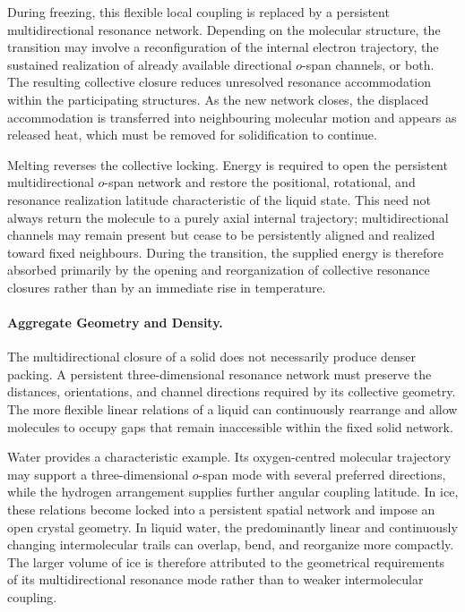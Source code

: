 \documentclass[11pt,a4paper]{article}
\begin{document}
During freezing, this flexible local coupling is replaced by a persistent multidirectional resonance network. Depending on the molecular structure, the transition may involve a reconfiguration of the internal electron trajectory, the sustained realization of already available directional \(o\)-span channels, or both. The resulting collective closure reduces unresolved resonance accommodation within the participating structures. As the new network closes, the displaced accommodation is transferred into neighbouring molecular motion and appears as released heat, which must be removed for solidification to continue.

Melting reverses the collective locking. Energy is required to open the persistent multidirectional \(o\)-span network and restore the positional, rotational, and resonance realization latitude characteristic of the liquid state. This need not always return the molecule to a purely axial internal trajectory; multidirectional channels may remain present but cease to be persistently aligned and realized toward fixed neighbours. During the transition, the supplied energy is therefore absorbed primarily by the opening and reorganization of collective resonance closures rather than by an immediate rise in temperature.

\paragraph{Aggregate Geometry and Density.}
The multidirectional closure of a solid does not necessarily produce denser packing. A persistent three-dimensional resonance network must preserve the distances, orientations, and channel directions required by its collective geometry. The more flexible linear relations of a liquid can continuously rearrange and allow molecules to occupy gaps that remain inaccessible within the fixed solid network.

Water provides a characteristic example. Its oxygen-centred molecular trajectory may support a three-dimensional \(o\)-span mode with several preferred directions, while the hydrogen arrangement supplies further angular coupling latitude. In ice, these relations become locked into a persistent spatial network and impose an open crystal geometry. In liquid water, the predominantly linear and continuously changing intermolecular trails can overlap, bend, and reorganize more compactly. The larger volume of ice is therefore attributed to the geometrical requirements of its multidirectional resonance mode rather than to weaker intermolecular coupling.
\end{document}
